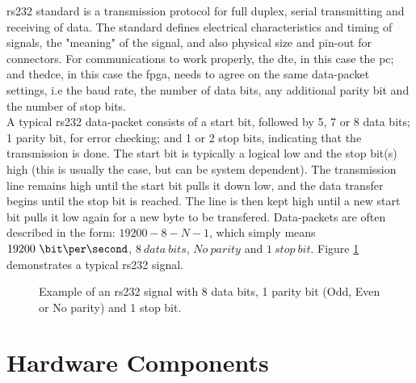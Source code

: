 \documentclass[main.tex]{subfiles}
\begin{document}
\acrshort{rs232} standard is a transmission protocol for full duplex, serial transmitting and receiving of data. The standard defines electrical characteristics and timing of signals, the "meaning" of the signal, and also physical size and pin-out for connectors.
For communications to work properly, the \gls{dte}, in this case the \acrshort{pc}; and the\gls{dce}, in this case the \gls{fpga}, needs to agree on the same data-packet settings, i.e the baud rate, the number of data bits, any additional parity bit and the number of stop bits.\\

A typical \acrshort{rs232} data-packet consists of a start bit, followed by 5, 7 or 8 data bits; 1 parity bit, for error checking; and 1 or 2 stop bits, indicating that the transmission is done. The start bit is typically a logical low and the stop bit(s) high (this is usually the case, but can be system dependent). The transmission line remains high until the start bit pulls it down low, and the data transfer begins until the stop bit is reached. The line is then kept high until a new start bit pulls it low again for a new byte to be transfered. Data-packets are often described in the form: $19200-8-N-1$, which simply means $19200~ \bit\per\second$, $8~ data~ bits$, $No~ parity$ and $1~ stop~ bit$. Figure \ref{fig:rs232} demonstrates a typical \acrshort{rs232} signal.\\

\begin{figure}[!h]
\begin{center}

\caption{Example of an \acrshort{rs232} signal with 8 data bits, 1 parity bit (Odd, Even or No parity) and 1 stop bit.}
\label{fig:rs232}

\end{center}
\end{figure}

\section{Hardware Components}
\end{document}
